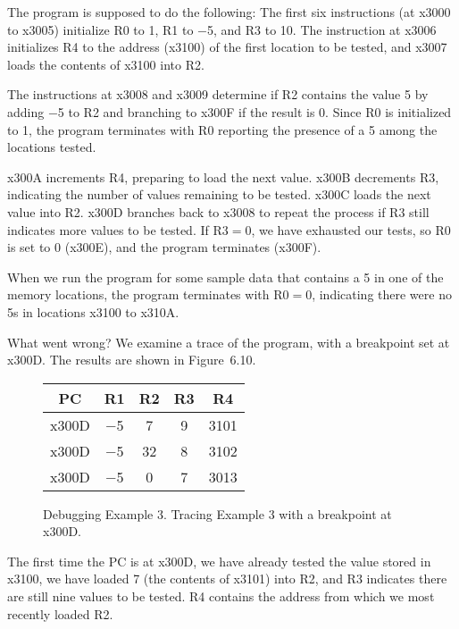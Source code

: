 \documentclass{patt}
\begin{document}
The program is supposed to do the following:
The first six instructions (at x3000 to x3005) initialize R0 to 1, R1
to $-$5, and R3 to 10.  
The instruction at x3006 initializes R4 to the address (x3100) of the
first location to be tested, and x3007 loads the contents of x3100 into R2.

The instructions at x3008 and x3009 determine if R2 contains the value 5 
by adding $-$5 to R2 and branching to x300F if the result is 0.  Since R0 is
initialized to 1, the program terminates with R0 reporting the
presence of a 5 among the locations tested.

x300A increments R4, preparing to load the next value.  x300B decrements R3,
indicating the number of values remaining to be tested.  x300C loads the
next value into R2.  x300D branches back to x3008 to repeat the process if
R3 still indicates more values to be tested.  If R3${}=0$, we have exhausted
our tests, so R0 is set to 0 (x300E), and the program terminates (x300F).

When we run the program for some sample data that contains a 5 in one of the
memory locations, the program terminates with R$0=0$, indicating 
there were no 5s in locations x3100 to x310A.

What went wrong? We examine a trace of the program, with a breakpoint
set at x300D.  The results are shown in Figure~6.10.

\setcounter{figure}{9}
\begin{figure}
\noindent\small
\begin{minipage}{36pc}
\begin{center}
\renewcommand{\tabcolsep}{6pt}%
\noindent\begin{tabular}{| c | c | c | c | c |}
\hline
PC    & R1 & R2 & R3 & R4 \\
\hline
x300D & $-$5 &  7 &  9 & 3101 \\
x300D & $-$5 & 32 &  8 & 3102 \\
x300D & $-$5 &  0 &  7 & 3013 \\
\hline
\end{tabular}
\end{center}
\caption{Debugging Example 3.  Tracing Example 3 with a breakpoint at x300D.\label{fig:onlinedebug}}
\end{minipage}
\end{figure}

The first time the PC is at x300D, we have already tested the value
stored in x3100, we have loaded 7 (the contents of x3101) into R2, and R3
indicates there are still nine values to be tested.  R4 contains the address
from which we most recently loaded R2.
\end{document}
